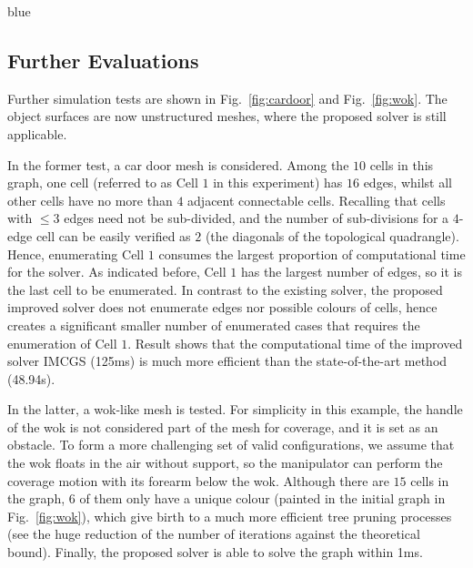 \documentclass[journal]{IEEEtran}
\begin{document}
\begin{color}{blue}
\subsection{Further Evaluations}
Further simulation tests are shown in Fig.~\ref{fig:cardoor} and Fig.~\ref{fig:wok}. 
The object surfaces are now unstructured meshes, where the proposed solver is still applicable. 

In the former test, a car door mesh is considered. 
Among the $10$ cells in this graph, one cell (referred to as Cell $1$ in this experiment) has $16$ edges, whilst all other cells have no more than $4$ adjacent connectable cells. 
Recalling that cells with $\leq 3$ edges need not be sub-divided, and the number of sub-divisions for a $4$-edge cell can be easily verified as $2$ (the diagonals of the topological quadrangle). 
Hence, enumerating Cell $1$ consumes the largest proportion of computational time for the solver. 
As indicated before, Cell $1$ has the largest number of edges, so it is the last cell to be enumerated. 
In contrast to the existing solver, the proposed improved solver does not enumerate edges nor possible colours of cells, hence creates a significant smaller number of enumerated cases that requires the enumeration of Cell $1$. 
Result shows that the computational time of the improved solver IMCGS (125ms) is much more efficient than the state-of-the-art method (48.94s). 

In the latter, a wok-like mesh is tested. 
For simplicity in this example, the handle of the wok is not considered part of the mesh for coverage, and it is set as an obstacle. 
To form a more challenging set of valid configurations, we assume that the wok floats in the air without support, so the manipulator can perform the coverage motion with its forearm below the wok. 
Although there are $15$ cells in the graph, $6$ of them only have a unique colour (painted in the initial graph in Fig.~\ref{fig:wok}), which give birth to a much more efficient tree pruning processes (see the huge reduction of the number of iterations against the theoretical bound). 
Finally, the proposed solver is able to solve the graph within 1ms. 

\end{color}
\end{document}
